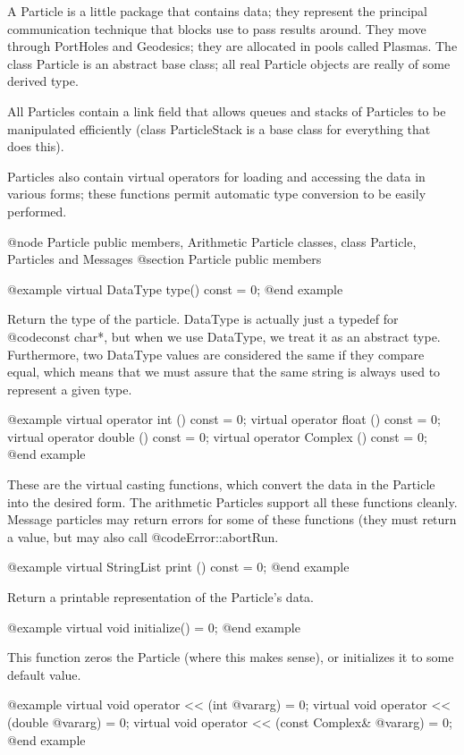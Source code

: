 A Particle is a little package that contains data; they represent the
principal communication technique that blocks use to pass results
around.  They move through PortHoles and Geodesics; they are allocated
in pools called Plasmas.  The class Particle is an abstract base class;
all real Particle objects are really of some derived type.

All Particles contain a link field that allows queues and stacks of
Particles to be manipulated efficiently (class ParticleStack is a base
class for everything that does this).

Particles also contain virtual operators for loading and accessing the
data in various forms; these functions permit automatic type conversion
to be easily performed.

@node Particle public members, Arithmetic Particle classes, class Particle, Particles and Messages
@section Particle public members

@example
virtual DataType type() const = 0;
@end example

Return the type of the particle.  DataType is actually just a typedef
for @code{const char*}, but when we use DataType, we treat it as an
abstract type.  Furthermore, two DataType values are considered the
same if they compare equal, which means that we must assure that
the same string is always used to represent a given type.

@example
virtual operator int () const = 0;
virtual operator float () const = 0;
virtual operator double () const = 0;
virtual operator Complex () const = 0;
@end example

These are the virtual casting functions, which convert the data in
the Particle into the desired form.  The arithmetic Particles support
all these functions cleanly.  Message particles may return errors for
some of these functions (they must return a value, but may also call
@code{Error::abortRun}.

@example
virtual StringList print () const = 0;
@end example

Return a printable representation of the Particle's data.

@example
virtual void initialize() = 0;
@end example

This function zeros the Particle (where this makes sense), or
initializes it to some default value.

@example
virtual void operator << (int @var{arg}) = 0;
virtual void operator << (double @var{arg}) = 0;
virtual void operator << (const Complex& @var{arg}) = 0;
@end example

